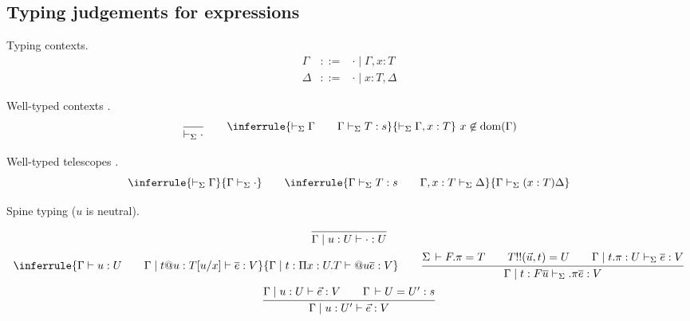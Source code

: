 \documentclass[acmlarge,fleqn]{acmart}\settopmatter{}
\DeclareMathOperator{\dom}{dom}
\DeclareMathOperator{\proj}{proj}
\renewcommand{\|}{\mid}
\begin{document}
\subsection{Typing judgements for expressions}


Typing contexts.
\[
\begin{array}{lcl}
\Gamma & ::= & \cdot \| \Gamma, x:T \\
\Delta & ::= & \cdot \| x:T, \Delta
\end{array}
\]

Well-typed contexts \fbox{$\vdash_\Sigma \Gamma$}.
\[
\ru{}{\vdash_\Sigma \cdot}
\qquad
\inferrule
  {\vdash_\Sigma \Gamma \qquad \Gamma \vdash_\Sigma T:s}
  {\vdash_\Sigma \Gamma, x : T} \ x \not\in \dom(\Gamma)
\]

Well-typed telescopes \fbox{$\Gamma \vdash_\Sigma \Delta$}.
\[
\inferrule
  {\vdash_\Sigma \Gamma}
  {\Gamma \vdash_\Sigma \cdot}
\qquad
\inferrule{\Gamma \vdash_\Sigma T : s \qquad \Gamma, x:T \vdash_\Sigma \Delta}
{\Gamma \vdash_\Sigma (x:T) \Delta}
\]

Spine typing \fbox{$\Gamma \| u : U \vdash \overline{e} : T$}
($u$ is neutral).
\begin{gather*}
\ru{}
{\Gamma \| u:U \vdash \cdot : U}
\\
\inferrule
  {\Gamma \vdash u:U \qquad \Gamma \| t@u:T[u/x] \vdash \overline{e} : V}
  {\Gamma \| t : \Pi x:U.T \vdash @u \overline{e}:V}
\qquad
\ru{\Sigma \der F.\pi = T \qquad
    T !! (\vec u,t) = U \qquad
    \Gamma \| t.\pi : U \vdash_\Sigma \overline{e} : V
  }{\Gamma \| t :  F\overline{u}  \vdash_\Sigma .\pi \overline{e} : V}
\\
\ru{\Gamma \mid u : U \vdash \vec e : V \qquad
    \Gamma \der U = U' : s
  }{\Gamma \mid u : U' \vdash \vec e : V}
\end{gather*}
\end{document}
